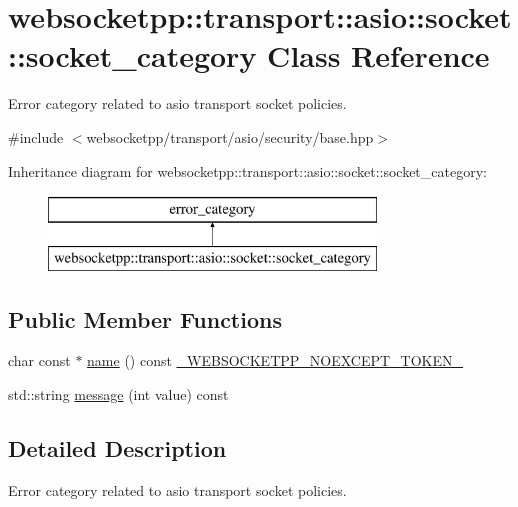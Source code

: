\hypertarget{classwebsocketpp_1_1transport_1_1asio_1_1socket_1_1socket__category}{}\section{websocketpp\+:\+:transport\+:\+:asio\+:\+:socket\+:\+:socket\+\_\+category Class Reference}
\label{classwebsocketpp_1_1transport_1_1asio_1_1socket_1_1socket__category}


Error category related to asio transport socket policies.  




{\ttfamily \#include $<$websocketpp/transport/asio/security/base.\+hpp$>$}

Inheritance diagram for websocketpp\+:\+:transport\+:\+:asio\+:\+:socket\+:\+:socket\+\_\+category\+:\begin{figure}[H]
\begin{center}
\leavevmode
\includegraphics[height=2.000000cm]{classwebsocketpp_1_1transport_1_1asio_1_1socket_1_1socket__category}
\end{center}
\end{figure}
\subsection*{Public Member Functions}
\begin{DoxyCompactItemize}
\item 
char const $\ast$ \hyperlink{classwebsocketpp_1_1transport_1_1asio_1_1socket_1_1socket__category_aae34251fd85287d7acc17a7ed6a5c79e}{name} () const \hyperlink{boost__config_8hpp_aa19747404a5f2fe9c9eb9e9d2e48f26c}{\+\_\+\+W\+E\+B\+S\+O\+C\+K\+E\+T\+P\+P\+\_\+\+N\+O\+E\+X\+C\+E\+P\+T\+\_\+\+T\+O\+K\+E\+N\+\_\+}
\item 
std\+::string \hyperlink{classwebsocketpp_1_1transport_1_1asio_1_1socket_1_1socket__category_abb1f4d24cbe20679b892a184b585f3dd}{message} (int value) const 
\end{DoxyCompactItemize}


\subsection{Detailed Description}
Error category related to asio transport socket policies. 

